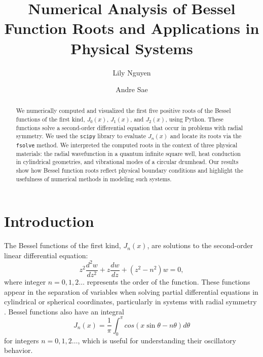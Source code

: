 \documentclass[linenumbers, twocolumn]{aastex631}
\begin{document}
\title{Numerical Analysis of Bessel Function Roots and Applications in Physical Systems}
\author{Lily Nguyen}

\author{Andre Sae}


\begin{abstract}

We numerically computed and visualized the first five positive
roots of the Bessel functions of the first kind, $J_0(x)$, $J_1(x)$, and $J_2(x)$,
using Python. These functions solve a second-order differential equation that 
occur in problems with radial symmetry. We used the \texttt{scipy} library to
evaluate $J_n(x)$ and locate its roots via the \texttt{fsolve} method. We
interpreted the computed roots in the context of three physical materials: the
radial wavefunction in a quantum infinite square well, heat conduction in
cylindrical geometries, and vibrational modes of a circular drumhead. Our
results show how Bessel function roots reflect physical boundary conditions
and highlight the usefulness of numerical methods in modeling such systems.

\end{abstract}



\section{Introduction} \label{sec:intro}

The Bessel functions of the first kind, $J_n(x)$, are solutions to the
second-order linear differential equation:
\begin{equation}
    z^2\frac{d^2 w}{dz^2}+z\frac{dw}{dz}+(z^2-n^2)w=0,
\end{equation}
\noindent where integer $n=0,1,2\dots$ represents the order of the
function. These functions appear in the separation of variables when solving
partial differential equations in cylindrical or spherical coordinates,
particularly in systems with radial symmetry \cite{abramowitz_stegun}. Bessel functions also have an
integral
\begin{equation}
    J_n(x)=\frac{1}{\pi}\int_0^\pi cos(x\sin\theta-n\theta)d\theta
\end{equation}
\noindent for integers $n=0,1,2\dots$, which is useful for understanding 
their oscillatory behavior.
\end{document}
